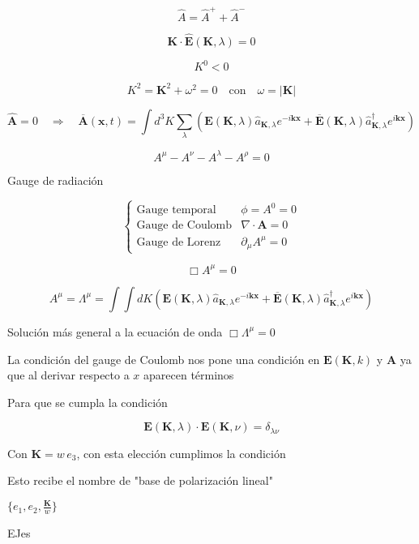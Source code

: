 $$
\hat{A} = \hat{A}^+ + \hat{A}^-
$$

$$
\mathbf{K} \cdot \mathbf{\hat{E}}(\mathbf{K}, \lambda) = 0
$$

$$
K^0 < 0 
$$

$$
K^2 = \mathbf{K}^2 + \omega^2 = 0 \quad \text{con} \quad \omega = |\mathbf{K}|
$$

$$
\hat{\mathbf{A}} = 0 \quad \Rightarrow \quad \overline{\mathbf{A}}(\mathbf{x},t) = \int d^3K \sum_\lambda \left( \mathbf{E}(\mathbf{K}, \lambda) \hat{a}_{\mathbf{K},\lambda} e^{-i\mathbf{kx}} + \overline{\mathbf{E}}(\mathbf{K},\lambda) \hat{a}^\dagger_{\mathbf{K},\lambda} e^{i\mathbf{kx}} \right)
$$

$$
A^\mu - A^\nu - A^\lambda - A^\rho = 0 
$$

Gauge de radiación

$$
\begin{cases}
\text{Gauge temporal} & \phi = A^0 = 0 \\
\text{Gauge de Coulomb} & \nabla \cdot \mathbf{A} = 0 \\
\text{Gauge de Lorenz} & \partial_\mu A^\mu = 0
\end{cases}
$$

$$
\Box A^\mu = 0
$$

$$
A^\mu = \Lambda^\mu = \int \int dK \left( \mathbf{E}(\mathbf{K}, \lambda) \hat{a}_{\mathbf{K},\lambda} e^{-i\mathbf{kx}} + \overline{\mathbf{E}}(\mathbf{K},\lambda) \hat{a}^\dagger_{\mathbf{K},\lambda} e^{i\mathbf{kx}} \right)
$$

Solución más general a la ecuación de onda $\Box \Lambda^\mu = 0$

La condición del gauge de Coulomb nos pone una condición en $\mathbf{E}(\mathbf{K}, k)$ y $\mathbf{A}$ ya que al derivar respecto a $x$ aparecen términos 

Para que se cumpla la condición

$$
\mathbf{E}(\mathbf{K}, \lambda) \cdot \mathbf{E}(\mathbf{K}, \nu) = \delta_{\lambda\nu}
$$

Con $\mathbf{K} = w \, e_3$, con esta elección cumplimos la condición 

Esto recibe el nombre de "base de polarización lineal"

$ \{e_1, e_2, \frac{\mathbf{K}}{w} \} $

\begin{marginfigure}[]
  \caption[]{EJes}
\end{marginfigure}

